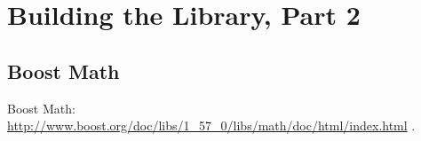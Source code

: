 %
%
%
%
%
%
%
%
%
%
%
%
%
%
%
%
%
%
%
%
%
%
%
%
%
%
%
%
%
%
%
%
%
%
%
%
%
%
%
%
%
%
%
%



\newpage
\section{Building the Library, Part 2}


\subsection{Boost Math}
Boost Math: \href{http://www.boost.org/doc/libs/1_57_0/libs/math/doc/html/index.html}{http://www.boost.org/doc/libs/1\_57\_0/libs/math/doc/html/index.html} . 

